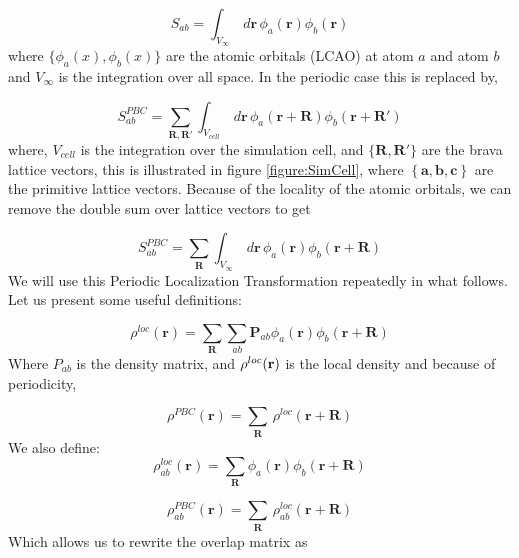 \documentclass[prb,aps,nobibnotes,twocolumn,doublespace,twocolumngrid,superbib]{revtex4}
\begin{document}
\begin{equation}
\label{Sab_norm}
S_{ab}=\int _{V_{\infty }}\, d{\mathbf{r}}\, \phi _{a}({\mathbf{r}})\phi _{b}
({\mathbf{r}})
\end{equation}
 where \( \{\phi _{a}(x),\phi _{b}(x)\} \) are the atomic orbitals
(LCAO) at atom \( a \) and atom \( b \) and \( V_{\infty } \) is
the integration over all space. In the periodic case this is replaced
by,

\begin{equation}
\label{Sab_pbc1}
S_{ab}^{PBC}=\sum _{\mathbf{R},\mathbf{R}'}\int _{V_{cell}}\, d{\mathbf{r}}\, 
\phi _{a}({\mathbf{r}+\mathbf{R}})\phi _{b}({\mathbf{r}+\mathbf{R}'})
\end{equation}
where, \( V_{cell} \) is the integration over the simulation cell,
and \( \{\mathbf{R},\mathbf{R}'\} \) are the brava lattice vectors,
this is illustrated in figure \ref{figure:SimCell}, where \( \left\{ {\mathbf{a},
\mathbf{b},\mathbf{c}}\right\}  \)
are the primitive lattice vectors. Because of the locality of the
atomic orbitals, we can remove the double sum over lattice vectors
to get

\begin{equation}
\label{Sab_pbc2}
S_{ab}^{PBC}=\sum _{\mathbf{R}}\int _{V_{\infty }}\, d{\mathbf{r}}\, \phi _{a}
({\mathbf{r}})\phi _{b}({\mathbf{r}+\mathbf{R}})
\end{equation}
We will use this Periodic Localization Transformation repeatedly
in what follows. Let us present some useful definitions:

\begin{equation}
\label{rho_loc}
\rho ^{loc}({\mathbf{r}})=\sum _{\mathbf{R}}\sum _{ab}{\mathbf{P}}_{ab}\phi _{a}
({\mathbf{r}})\phi _{b}({\mathbf{r}+\mathbf{R}})
\end{equation}
Where $P_{ab}$ is the density matrix, and $\rho^{loc}({\bf r})$ is the local density
and because of periodicity,

\begin{equation}
\label{rho_pbc}
\rho ^{PBC}({\mathbf{r}})=\sum _{\mathbf{R}}\, \rho ^{loc}({\mathbf{r}+\mathbf{R}})
\end{equation}
We also define:\begin{equation}
\label{rho_loc_ab}
\rho _{ab}^{loc}({\mathbf{r}})=\sum _{\mathbf{R}}\phi _{a}({\mathbf{r}})\phi _{b}
({\mathbf{r}+\mathbf{R}})
\end{equation}


\begin{equation}
\label{rho_pbc_ab}
\rho _{ab}^{PBC}({\mathbf{r}})=\sum _{\mathbf{R}}\, \rho _{ab}^{loc}({\mathbf{r}+
\mathbf{R}})
\end{equation}
Which allows us to rewrite the overlap matrix as
\end{document}
